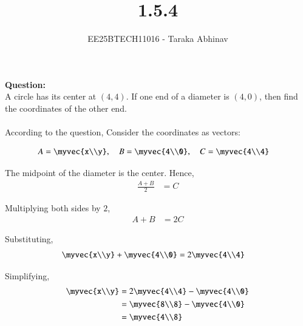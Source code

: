 \documentclass[journal]{IEEEtran}
\begin{document}
	
	
	\vspace{3cm}
	
	\title{1.5.4}
	\author{EE25BTECH11016 - Taraka Abhinav}
	\maketitle
	{\let\newpage\relax\maketitle}
	
	\renewcommand{\thefigure}{\theenumi}
	\renewcommand{\thetable}{\theenumi}
	\setlength{\intextsep}{10pt} %
	
	
	\renewcommand{\thetable}{\theenumi}

\textbf{Question:}\\
A circle has its center at $(4,4)$. If one end of a diameter is $(4,0)$, then find the coordinates of the other end.\\
\solution\\
According to the question,  
Consider the coordinates as vectors:

\begin{align*}
A &= \myvec{x\\y}, \quad B = \myvec{4\\0}, \quad C = \myvec{4\\4}
\end{align*}

The midpoint of the diameter is the center. Hence,
\begin{align*}
\frac{A+B}{2} &= C
\end{align*}

Multiplying both sides by $2$,
\begin{align*}
A + B &= 2C
\end{align*}

Substituting,
\begin{align*}
\myvec{x\\y} + \myvec{4\\0} &= 2\myvec{4\\4}
\end{align*}

Simplifying,
\begin{align*}
\myvec{x\\y} &= 2\myvec{4\\4} - \myvec{4\\0} \\
&= \myvec{8\\8} - \myvec{4\\0} \\
&= \myvec{4\\8}
\end{align*}
\end{document}
